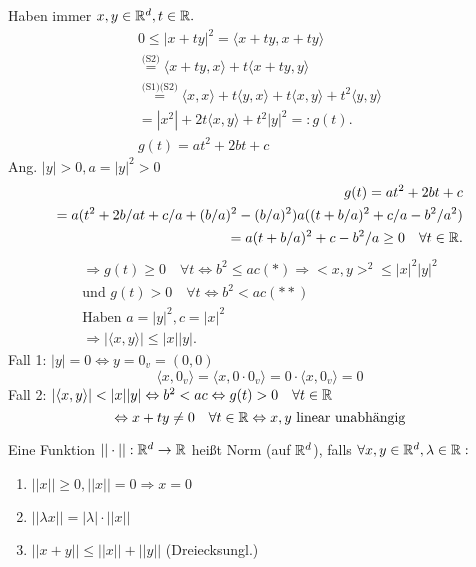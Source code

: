 \documentclass[../ana1.tex]{subfiles}
\begin{document}
\begin{bew}
	Haben immer \( x,y\in\mathbb{R}^d, t\in\mathbb{R}. \)
	\begin{align*}
		0\leq |x+ty|^2 = \langle x+ty, x+ty\rangle\\
		\overset{\text{(S2)}}{=} \langle x+ty,x\rangle + t\langle x+ty,y\rangle\\
		\overset{\text{(S1)(S2)}}{=} \langle x,x\rangle + t \langle y,x\rangle + t\langle x,y\rangle + t^2\langle y,y\rangle\\
		= |x^2| + 2t\langle x,y\rangle + t^2|y|^2 =: g(t).\\
		g(t) = at^2 + 2bt + c
	\end{align*}
	Ang. \(|y| > 0, a = |y|^2 > 0 \)
	\begin{align*}
		g(t) = at^2 + 2bt + c\\
		= a(t^2 + 2b/a t + c/a + (b/a)^2 - (b/a)^2) a((t+b/a)^2 + c/a - b^2/a^2)\\
		= a(t+b/a)^2 + c - b^2/a \geq 0 \quad\forall t\in\mathbb{R}.
	\end{align*}
	\begin{align*}
		\Rightarrow g(t) \geq 0 \quad\forall t \Leftrightarrow b^2 \leq ac (*) \Rightarrow <x,y>^2 \leq |x|^2|y|^2\\
		\text{und }g(t) > 0 \quad\forall t \Leftrightarrow b^2 < ac (**)\\
		\text{Haben }  a=|y|^2, c=|x|^2\\
		\Rightarrow |\langle x,y\rangle|\leq |x||y|.
	\end{align*}
	Fall 1: \(|y| = 0 \Leftrightarrow y = 0_v = (0, 0)\)
	\[\langle x, 0_v\rangle = \langle x, 0 \cdot 0_v\rangle = 0 \cdot \langle x, 0_v\rangle = 0\]
	Fall 2: \(|\langle x, y\rangle| < |x||y| \Leftrightarrow b^2 < ac \Leftrightarrow g(t) > 0 \quad \forall t \in \mathbb{R}\)\\
	\[\Leftrightarrow x + ty \neq 0 \quad \forall t \in \mathbb{R} \Leftrightarrow x, y \text{ linear unabhängig} \]
\end{bew}
\begin{defi}
	Eine Funktion \( ||\cdot || : \mathbb{R}^d \rightarrow \mathbb{R} \) heißt Norm (auf \( \mathbb{R}^d \)), falls \( \forall x,y\in\mathbb{R}^d, \lambda\in\mathbb{R}: \)
	\begin{enumerate}
		\item \( ||x||\geq 0, ||x|| = 0 \Rightarrow x = 0 \)
		\item \( ||\lambda x|| = |\lambda|\cdot||x|| \)
		\item \( ||x+y|| \leq ||x|| + ||y|| \) (Dreiecksungl.)
	\end{enumerate}
\end{defi}
\end{document}
